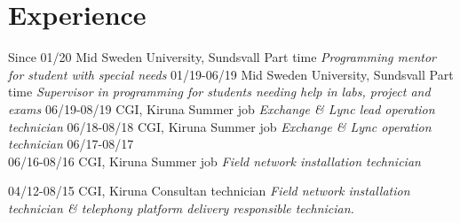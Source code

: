 \section{Experience}

\begin{entrylist}
  \entry
    {Since 01/20}
    {Mid Sweden University, Sundsvall}
    {Part time}
    {\emph{Programming mentor for student with special needs}}
  \entry
    {01/19-06/19}
    {Mid Sweden University, Sundsvall}
    {Part time}
    {\emph{Supervisor in programming for students needing help in labs, project and \\ exams}}
  \entry
    {06/19-08/19}
    {CGI, Kiruna}
    {Summer job}
    {\emph{Exchange \& Lync lead operation technician}}
  \entry
    {06/18-08/18}
    {CGI, Kiruna}
    {Summer job}
    {\emph{Exchange \& Lync operation technician}}
  \entry
    {06/17-08/17 \\ 06/16-08/16}
    {CGI, Kiruna}
    {Summer job}
    {\emph{Field network installation technician}}

  \entry
    {04/12-08/15}
    {CGI, Kiruna}
    {Consultan technician}
    {\emph{Field network installation technician \& telephony platform delivery responsible technician.}}
\end{entrylist}